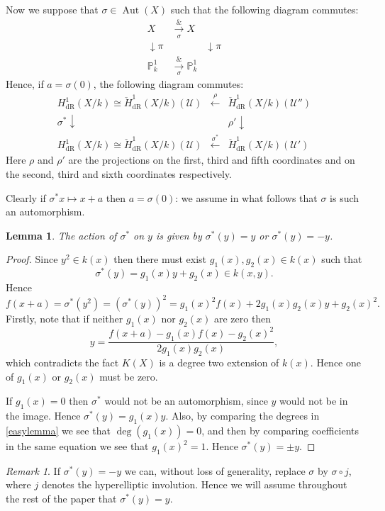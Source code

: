 \documentclass[draft, 11pt]{article} %
\theoremstyle{plain}
\newtheorem{lem}[defn]{Lemma}
\theoremstyle{remark}
\newtheorem*{rem}{Remark}
\newcommand{\cU}{{\mathcal U}}
\newcommand{\derhamhone}{H_{\text {dR}}^1(X/k)}
\newcommand{\cechderhamhone}{\check{H}_{\text {dR}}^1(X/k)}
\DeclareMathOperator{\aut}{Aut}
\begin{document}
Now we suppose that $\sigma \in \aut(X)$ such that the following diagram commutes:
\[
\begin{array}{ccc}
X & \xrightarrow[\sigma] & X \\
\downarrow\pi & & \downarrow\pi \\
\mathbb P^1_k & \xrightarrow[\sigma] & \mathbb P_k^1
\end{array}
\]
Hence, if $a = \sigma(0)$, the following diagram commutes:
\[
\begin{array}{ccc}
\derhamhone \cong \cechderhamhone(\cU)  & \xleftarrow{\rho} & \cechderhamhone(\cU'')  \\
\sigma^*\downarrow & ~ & \rho'\downarrow  \\
\derhamhone \cong \cechderhamhone(\cU)  & \xleftarrow{\sigma^*} & \cechderhamhone(\cU')
\end{array}
\]
Here $\rho$ and $\rho'$ are the projections on the first, third and fifth coordinates and on the second, third and sixth coordinates respectively.


Clearly if $\sigma^* x \mapsto x+a$ then $a = \sigma(0)$: we assume in what follows that $\sigma$ is such an automorphism.
\begin{lem}
The action of $\sigma^*$ on $y$ is given by $\sigma^*(y) = y$ or $\sigma^*(y) = -y$.
\end{lem}
\begin{proof}
Since $y^2 \in k(x)$ then there must exist $g_1(x), g_2(x) \in k(x)$ such that 
\begin{equation*}
\sigma^*(y) = g_1(x)y + g_2(x) \in k(x,y).
\end{equation*}
Hence
\begin{equation}\label{easylemma}
f(x+a) = \sigma^*(y^2) = (\sigma^*(y))^2 = g_1(x)^2f(x)+2g_1(x)g_2(x)y + g_2(x)^2.
\end{equation}
Firstly, note that if neither $g_1(x)$ nor $g_2(x)$ are zero then
\[
y = \frac{f(x+a) - g_1(x)f(x) - g_2(x)^2}{2g_1(x)g_2(x)},
\]
which contradicts the fact $K(X)$ is a degree two extension of $k(x)$.
Hence one of $g_1(x)$ or $g_2(x)$ must be zero.

If $g_1(x) = 0$ then $\sigma^*$ would not be an automorphism, since $y$ would not be in the image.
Hence $\sigma^*(y) = g_1(x)y$.
Also, by comparing the degrees in \eqref{easylemma} we see that $\deg(g_1(x)) = 0$, and then by comparing coefficients in the same equation we see that $g_1(x)^2 = 1$.
Hence $\sigma^*(y) = \pm y$.
\end{proof}
\begin{rem}
If $\sigma^*(y) = -y$ we can, without loss of generality, replace $\sigma$ by $\sigma \circ j$, where $j$ denotes the hyperelliptic involution.
Hence we will assume throughout the rest of the paper that $\sigma^*(y) = y$.
\end{rem}
\end{document}
